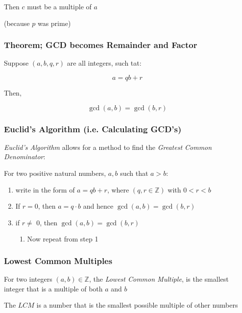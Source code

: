 \documentclass[
]{article}
\begin{document}
Then \(c\) must be a multiple of \(a\)

(because \(p\) was prime)

\hypertarget{header-n145}{%
\subsubsection{Theorem; GCD becomes Remainder and
Factor}\label{header-n145}}

Suppose \((a,b,q,r)\) are all integers, such tat:

\[a = qb +r\]

Then,

\[\gcd(a,b) =\gcd(b,r)\]

\hypertarget{header-n150}{%
\subsubsection{Euclid's Algorithm (i.e. Calculating
GCD's)}\label{header-n150}}

\emph{Euclid's Algorithm} allows for a method to find the \emph{Greatest
Common Denominator}:

For two positive natural numbers, \(a,b\) such that \(a>b\):

\begin{enumerate}
\def\labelenumi{\arabic{enumi}.}
\item
  write in the form of \(a=qb+r\), where \((q,r\in \mathbb{Z})\) with
  \(0<r<b\)
\item
  If \(r=0\), then \(a=q\cdot b\) and hence \(\gcd(a,b) = \gcd(b,r)\)
\item
  if \(r\neq\) 0, then \(\gcd(a,b) = \gcd(b,r)\)

  \begin{enumerate}
  \def\labelenumii{\arabic{enumii}.}
  \item
    Now repeat from step 1 
  \end{enumerate}
\end{enumerate}

\hypertarget{header-n163}{%
\subsubsection{Lowest Common Multiples}\label{header-n163}}

For two integers \((a,b) \in \mathbb{Z}\), the \emph{Lowest Common
Multiple}, is the smallest integer that is a multiple of both \(a\) and
\(b\)

The \(LCM\) is a number that is the smallest possible multiple of other
numbers
\end{document}

